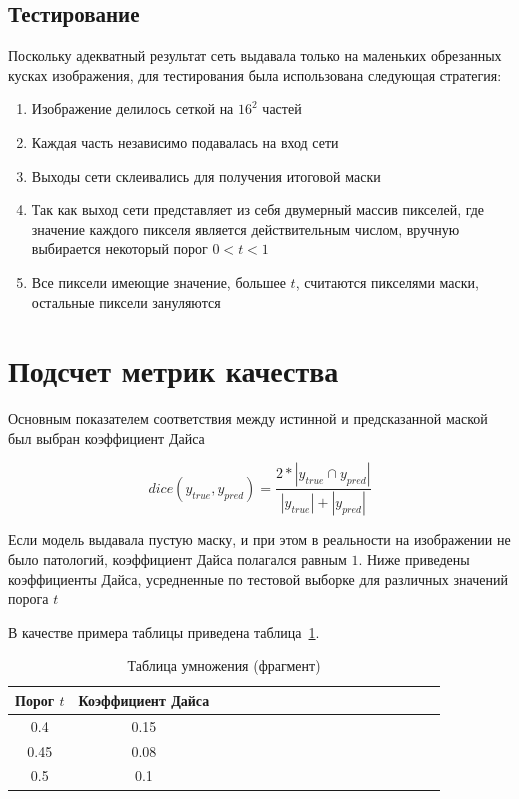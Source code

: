 \subsection{Тестирование}

Поскольку адекватный результат сеть выдавала только на маленьких обрезанных кусках изображения, для тестирования была использована следующая стратегия:

\begin{enumerate}
    \item Изображение делилось сеткой на $16^2$ частей
    \item Каждая часть независимо подавалась на вход сети
    \item Выходы сети склеивались для получения итоговой маски
    \item Так как выход сети представляет из себя двумерный массив пикселей, где значение каждого пикселя является действительным числом, вручную выбирается некоторый порог $0 < t < 1$
    \item Все пиксели имеющие значение, большее $t$, считаются пикселями маски, остальные пиксели зануляются
\end{enumerate}



\section{Подсчет метрик качества}

Основным показателем соответствия между истинной и предсказанной маской был выбран коэффициент Дайса

$$ dice(y_{true}, y_{pred}) = \dfrac{2 * |y_{true} \cap y_{pred}|}{ |y_{true}| + |y_{pred}|} $$

Если модель выдавала пустую маску, и при этом в реальности на изображении не было патологий, коэффициент Дайса полагался равным $1$. Ниже приведены коэффициенты Дайса, усредненные по тестовой выборке для различных значений порога $t$ 

В качестве примера таблицы приведена таблица~\ref{tab1}.

\begin{table}[!h]
\caption{Таблица умножения (фрагмент)}\label{tab1}
\centering
\begin{tabular}{|*{18}{c|}}\hline
\textbf{Порог $t$} & \textbf{Коэффициент Дайса} \\\hline
0.4 & 0.15 \\\hline
0.45 & 0.08 \\\hline
0.5 & 0.1 \\\hline
\end{tabular}
\end{table}

